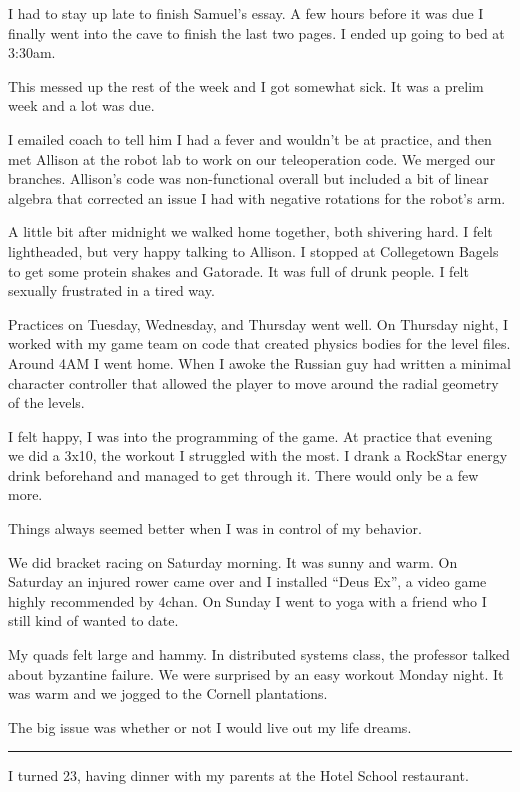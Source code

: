 I had to stay up late to finish Samuel's essay.  A few hours before it was due I
finally went into the cave to finish the last two pages.  I ended up going to
bed at 3:30am.

This messed up the rest of the week and I got somewhat sick.  It was a prelim
week and a lot was due.

I emailed coach to tell him I had a fever and wouldn't be at practice, and then
met Allison at the robot lab to work on our teleoperation code.  We merged our
branches.  Allison's code was non-functional overall but included a bit of
linear algebra that corrected an issue I had with negative rotations
for the robot's arm.

A little bit after midnight we walked home together, both shivering hard.  I
felt lightheaded, but very happy talking to Allison.  I stopped at Collegetown
Bagels to get some protein shakes and Gatorade.  It was full of drunk people.  I
felt sexually frustrated in a tired way.

Practices on Tuesday, Wednesday, and Thursday went well.  On Thursday night, I
worked with my game team on code that created physics bodies for the level
files.  Around 4AM I went home.  When I awoke the Russian guy had written a
minimal character controller that allowed the player to move around the radial
geometry of the levels.

I felt happy, I was into the programming of the game.  At practice that evening
we did a 3x10, the workout I struggled with the most.  I drank a RockStar energy
drink beforehand and managed to get through it.  There would only be a few more. 

Things always seemed better when I was in control of my behavior.

We did bracket racing on Saturday morning.  It was sunny and warm.  On Saturday
an injured rower came over and I installed ``Deus Ex'', a video game highly
recommended by 4chan.   On Sunday I went to yoga with a friend who I still kind
of wanted to date.

My quads felt large and hammy.  In distributed systems class, the professor
talked about byzantine failure.  We were surprised by an easy workout Monday
night.  It was warm and we jogged to the Cornell plantations.

The big issue was whether or not I would live out my life dreams.

\plainfancybreak{12pt}{2}{* * *}

I turned 23, having dinner with my parents at the Hotel School restaurant.

